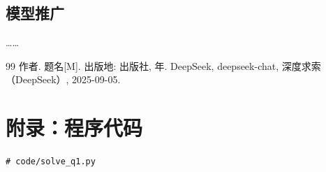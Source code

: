 \documentclass[UTF8,12pt,fontset=windows]{ctexart}
\begin{document}
\subsection{模型推广}
……

\begin{thebibliography}{99}
 作者. 题名[M]. 出版地: 出版社, 年.
 DeepSeek, deepseek-chat, 深度求索（DeepSeek）, 2025-09-05.
\end{thebibliography}

\newpage
\appendix
\section{附录：程序代码}

\begin{verbatim}
# code/solve_q1.py
\end{verbatim}
\end{document}
